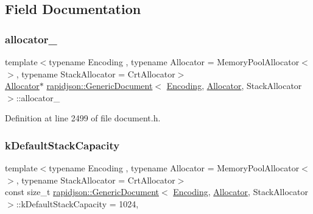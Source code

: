\subsection{Field Documentation}
\mbox{\label{classrapidjson_1_1_generic_document_a3ea1933117950ae8d39ead0774c14f12}} 
\subsubsection{\texorpdfstring{allocator\_}{allocator\_}}
{\footnotesize\ttfamily template$<$typename Encoding , typename Allocator  = Memory\+Pool\+Allocator$<$$>$, typename Stack\+Allocator  = Crt\+Allocator$>$ \\
\mbox{\hyperlink{classrapidjson_1_1_allocator}{Allocator}}$\ast$ \mbox{\hyperlink{classrapidjson_1_1_generic_document}{rapidjson\+::\+Generic\+Document}}$<$ \mbox{\hyperlink{classrapidjson_1_1_encoding}{Encoding}}, \mbox{\hyperlink{classrapidjson_1_1_allocator}{Allocator}}, Stack\+Allocator $>$\+::allocator\+\_\+\hspace{0.3cm}{\ttfamily [private]}}



Definition at line 2499 of file document.\+h.

\mbox{\label{classrapidjson_1_1_generic_document_a557c989fcf60e58100c189555c47aa5a}} 
\subsubsection{\texorpdfstring{kDefaultStackCapacity}{kDefaultStackCapacity}}
{\footnotesize\ttfamily template$<$typename Encoding , typename Allocator  = Memory\+Pool\+Allocator$<$$>$, typename Stack\+Allocator  = Crt\+Allocator$>$ \\
const size\+\_\+t \mbox{\hyperlink{classrapidjson_1_1_generic_document}{rapidjson\+::\+Generic\+Document}}$<$ \mbox{\hyperlink{classrapidjson_1_1_encoding}{Encoding}}, \mbox{\hyperlink{classrapidjson_1_1_allocator}{Allocator}}, Stack\+Allocator $>$\+::k\+Default\+Stack\+Capacity = 1024\hspace{0.3cm}{\ttfamily [static]}, {\ttfamily [private]}}



